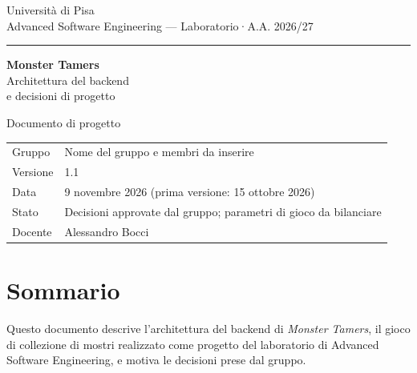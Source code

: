 \documentclass[11pt,a4paper]{article}
\newcommand{\versione}{1.1}
\newcommand{\datadoc}{9 novembre 2026 (prima versione: 15 ottobre 2026)}
\newcommand{\gruppo}{Nome del gruppo e membri da inserire}
\begin{document}

\hypersetup{pageanchor=false}
\begin{titlepage}
  \sffamily
  \vspace*{1cm}
  {\large Università di Pisa}\\[0.2em]
  {\normalsize Advanced Software Engineering — Laboratorio\quad·\quad A.A. 2026/27}

  \vspace{0.6cm}
  \rule{\linewidth}{0.8pt}

  \vspace{3.2cm}
  {\fontsize{34}{40}\selectfont\bfseries Monster Tamers}\\[0.8em]
  {\LARGE Architettura del backend\\[0.2em] e decisioni di progetto}

  \vspace{1.2cm}
  {\large Documento di progetto}

  \vfill
  \begin{tabular}{@{}ll@{}}
    \toprule
    Gruppo          & \gruppo \\
    Versione        & \versione \\
    Data            & \datadoc \\
    Stato           & Decisioni approvate dal gruppo; parametri di gioco da bilanciare \\
    Docente         & Alessandro Bocci \\
    \bottomrule
  \end{tabular}
  \vspace{1cm}
\end{titlepage}
\hypersetup{pageanchor=true}

\section*{Sommario}

Questo documento descrive l'architettura del backend di \emph{Monster Tamers}, il gioco di collezione di mostri realizzato come progetto del laboratorio di Advanced Software Engineering, e motiva le decisioni prese dal gruppo.
\end{document}
